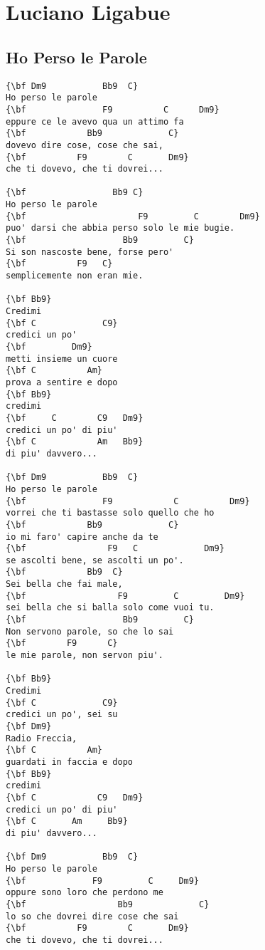 \documentclass[a4paper]{article}
\begin{document}
\section{Luciano Ligabue} %
\label{sec:Luciano Ligabue}
\subsection{Ho Perso le Parole} %
\label{sub:Ho Perso le Parole}
\begin{multicols}{2}
\begin{Verbatim}[commandchars=\\\{\}]
{\bf Dm9           Bb9  C}
Ho perso le parole
{\bf               F9          C      Dm9}
eppure ce le avevo qua un attimo fa
{\bf            Bb9             C}
dovevo dire cose, cose che sai,
{\bf          F9        C       Dm9}
che ti dovevo, che ti dovrei...

{\bf                 Bb9 C}
Ho perso le parole
{\bf                      F9         C        Dm9}
puo' darsi che abbia perso solo le mie bugie.
{\bf                   Bb9         C}
Si son nascoste bene, forse pero'
{\bf          F9   C}
semplicemente non eran mie.

{\bf Bb9}
Credimi
{\bf C             C9}
credici un po'
{\bf         Dm9}
metti insieme un cuore
{\bf C          Am}
prova a sentire e dopo
{\bf Bb9}
credimi
{\bf     C        C9   Dm9}
credici un po' di piu'
{\bf C            Am   Bb9}
di piu' davvero...

{\bf Dm9           Bb9  C}
Ho perso le parole
{\bf               F9            C          Dm9}
vorrei che ti bastasse solo quello che ho
{\bf            Bb9             C}
io mi faro' capire anche da te
{\bf                F9   C             Dm9}
se ascolti bene, se ascolti un po'.
{\bf  		    Bb9  C}
Sei bella che fai male,
{\bf                  F9         C         Dm9}
sei bella che si balla solo come vuoi tu.
{\bf                   Bb9         C}
Non servono parole, so che lo sai
{\bf        F9      C}
le mie parole, non servon piu'.

{\bf Bb9}
Credimi
{\bf C             C9}
credici un po', sei su
{\bf Dm9}
Radio Freccia,
{\bf C          Am}
guardati in faccia e dopo
{\bf Bb9}
credimi
{\bf C            C9   Dm9}
credici un po' di piu' 
{\bf C       Am     Bb9}
di piu' davvero...

{\bf Dm9           Bb9  C}
Ho perso le parole
{\bf             F9         C     Dm9}
oppure sono loro che perdono me
{\bf                  Bb9             C}
lo so che dovrei dire cose che sai
{\bf          F9        C       Dm9}
che ti dovevo, che ti dovrei...


\end{Verbatim}
\end{multicols}
\end{document}
